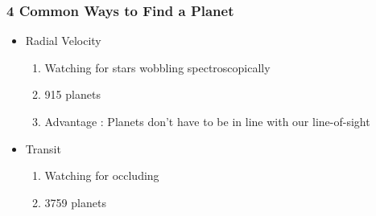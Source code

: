 \documentclass{beamer}
\begin{document}
\begin{frame}
\frametitle{4 Common Ways to Find a Planet}
\begin{itemize}
    \item Radial Velocity 
        \pause
        \begin{enumerate}
            \item Watching for stars wobbling spectroscopically
            \pause
            \item 915 planets
            \pause
            \item Advantage : Planets don't have to be in line with our line-of-sight
        \end{enumerate}
    \item Transit
        \pause
        \begin{enumerate}
            \item Watching for occluding 
            \pause
            \item 3759 planets
    

\end{enumerate}
\end{itemize}
\end{frame}
\end{document}
